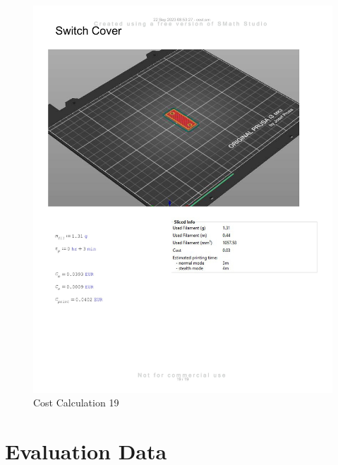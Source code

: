\begin{figure}[H]
    \centering
    \includegraphics[width=\linewidth]{texs/appendix/data/costcalculation/cost1-19.jpg}
    \caption{Cost Calculation 19}
    \label{fig:cost-calculation-19}
\end{figure}

\section{Evaluation Data}
\label{appendix:evaluation-data}

